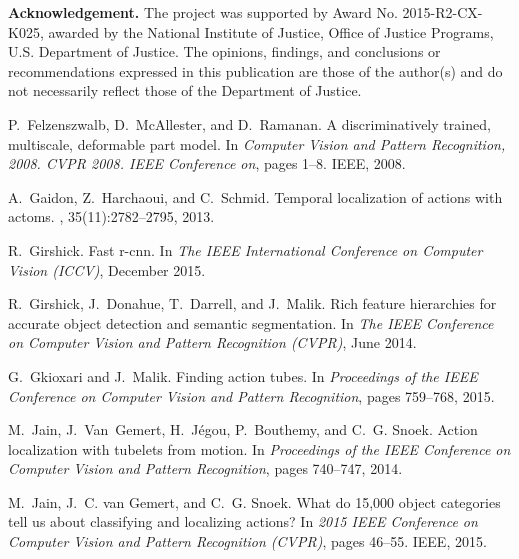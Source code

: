 \documentclass[10pt,twocolumn,letterpaper]{article}
\begin{document}
\vspace{0.75em}
\noindent \small{\textbf{Acknowledgement.} The project was supported by Award No. 2015-R2-CX-K025, awarded by the National Institute of Justice, Office of Justice Programs, U.S. Department of Justice. The opinions, findings, and conclusions or recommendations expressed in this publication are those of the author(s) and do not necessarily reflect those of the Department of Justice.}




{\small


\begin{thebibliography}{10}\itemsep=-1pt

P.~Felzenszwalb, D.~McAllester, and D.~Ramanan.
\newblock A discriminatively trained, multiscale, deformable part model.
\newblock In {\em Computer Vision and Pattern Recognition, 2008. CVPR 2008.
  IEEE Conference on}, pages 1--8. IEEE, 2008.

A.~Gaidon, Z.~Harchaoui, and C.~Schmid.
\newblock Temporal localization of actions with actoms.
,
  35(11):2782--2795, 2013.

R.~Girshick.
\newblock Fast r-cnn.
\newblock In {\em The IEEE International Conference on Computer Vision (ICCV)},
  December 2015.

R.~Girshick, J.~Donahue, T.~Darrell, and J.~Malik.
\newblock Rich feature hierarchies for accurate object detection and semantic
  segmentation.
\newblock In {\em The IEEE Conference on Computer Vision and Pattern
  Recognition (CVPR)}, June 2014.

G.~Gkioxari and J.~Malik.
\newblock Finding action tubes.
\newblock In {\em Proceedings of the IEEE Conference on Computer Vision and
  Pattern Recognition}, pages 759--768, 2015.

M.~Jain, J.~Van~Gemert, H.~J{\'e}gou, P.~Bouthemy, and C.~G. Snoek.
\newblock Action localization with tubelets from motion.
\newblock In {\em Proceedings of the IEEE Conference on Computer Vision and
  Pattern Recognition}, pages 740--747, 2014.

M.~Jain, J.~C. van Gemert, and C.~G. Snoek.
\newblock What do 15,000 object categories tell us about classifying and
  localizing actions?
\newblock In {\em 2015 IEEE Conference on Computer Vision and Pattern
  Recognition (CVPR)}, pages 46--55. IEEE, 2015.


\end{thebibliography}}
\end{document}
